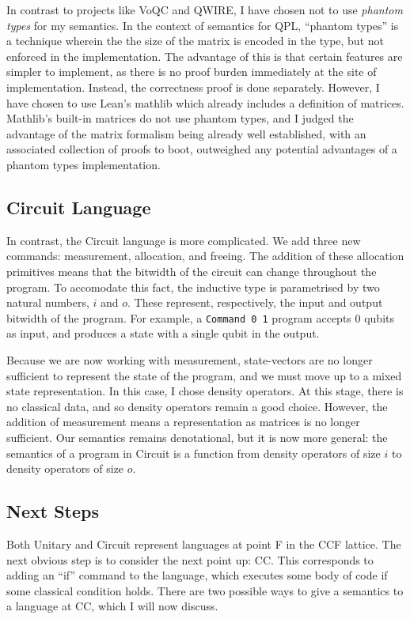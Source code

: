 In contrast to projects like VoQC and QWIRE, I have chosen not to use \emph{phantom types} \cite{Rand_Paykin_2018_phantom_types} for my semantics.
% 
In the context of semantics for QPL, ``phantom types'' is a technique wherein the the size of the matrix is encoded in the type, 
but not enforced in the implementation.
% 
The advantage of this is that certain features are simpler to implement, as there is no proof burden immediately at the site of implementation.
% 
Instead, the correctness proof is done separately.
% 
However, I have chosen to use Lean's mathlib \cite{mathlib} which already includes a definition of matrices.
% 
Mathlib's built-in matrices do not use phantom types, and I judged the advantage of the matrix formalism being already well 
established, with an associated collection of proofs to boot, outweighed any potential advantages of a phantom types implementation.



\subsection{Circuit Language}
In contrast, the Circuit language is more complicated.
% 
We add three new commands: measurement, allocation, and freeing.
% 
The addition of these allocation primitives means that the bitwidth of the circuit can change 
throughout the program.
% 
To accomodate this fact, the inductive type is parametrised by two natural numbers, $i$ and $o$. 
% 
These represent, respectively, the input and output bitwidth of the program.
% 
For example, a \texttt{Command 0 1} program accepts 0 qubits as input, and produces a state with a single qubit in the output.


Because we are now working with measurement, state-vectors are no longer sufficient to represent the state of the program,
and we must move up to a mixed state representation.
% 
In this case, I chose density operators. 
% 
At this stage, there is no classical data, and so density operators remain a good choice.
% 
However, the addition of measurement means a representation as matrices is no longer sufficient.
% 
Our semantics remains denotational, but it is now more general:
the semantics of a program in Circuit is a function from density operators of size $i$ to density operators of size $o$.


\subsection{Next Steps}
Both Unitary and Circuit represent languages at point F in the CCF lattice.
% 
The next obvious step is to consider the next point up: CC.
% 
This corresponds to adding an ``if'' command to the language, which executes some body of code if some classical condition holds.
% 
There are two possible ways to give a semantics to a language at CC, which I will now discuss.


